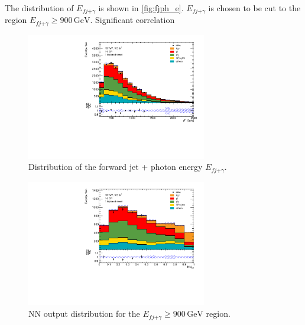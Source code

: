 The distribution of $E_{fj\text{+}\gamma}$ is shown in \autoref{fig:fjph_e}. $E_{fj\text{+}\gamma}$ is chosen to be cut to the region $E_{fj\text{+}\gamma} \geq 900\,\si{\giga\electronvolt}$. 
Significant correlation 

\begin{figure}
    \centering
    \includegraphics[width=0.7\textwidth]{Plots/fjph_e.pdf}
    \caption{Distribution of the forward jet + photon energy $E_{fj\text{+}\gamma}$.}
    \label{fig:fjph_e}
\end{figure} 

\begin{figure}
    \centering
    \includegraphics[width=0.7\textwidth]{Plots/NN_out_mixfjphA900.pdf}
    \caption{NN output distribution for the $E_{fj\text{+}\gamma} \geq 900\,\si{\giga\electronvolt}$ region.}
    \label{fig:outputA900fjph_e}
\end{figure} 


